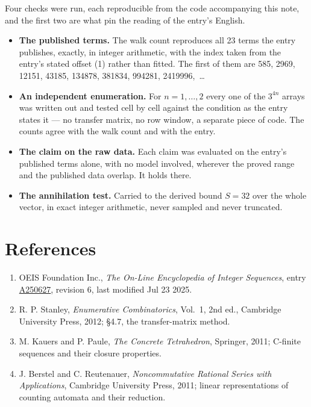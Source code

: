 \documentclass[11pt]{article}
\theoremstyle{definition}
\begin{document}
Four checks were run, each reproducible from the code accompanying this note, and the first two are what pin the reading of the entry's English.

\begin{itemize}

\item {\bfseries The published terms.} The walk count reproduces all 23 terms the entry publishes, exactly, in integer arithmetic, with the index taken from the entry's stated offset (1) rather than fitted. The first of them are 585, 2969, 12151, 43185, 134878, 381834, 994281, 2419996,~\dots

\item {\bfseries An independent enumeration.} For $n = 1,\dots,2$ every one of the $3^{4n}$ arrays was written out and tested cell by cell against the condition as the entry states it --- no transfer matrix, no row window, a separate piece of code. The counts agree with the walk count and with the entry.

\item {\bfseries The claim on the raw data.} Each claim was evaluated on the entry's published terms alone, with no model involved, wherever the proved range and the published data overlap. It holds there.

\item {\bfseries The annihilation test.} Carried to the derived bound $S = 32$ over the whole vector, in exact integer arithmetic, never sampled and never truncated.

\end{itemize}

\section{References}

\begin{enumerate}

\item OEIS Foundation Inc., \emph{The On-Line Encyclopedia of Integer Sequences}, entry \href{https://oeis.org/A250627}{A250627}, revision 6, last modified Jul 23 2025.

\item R. P. Stanley, \emph{Enumerative Combinatorics}, Vol.~1, 2nd ed., Cambridge University Press, 2012; \S4.7, the transfer-matrix method.

\item M. Kauers and P. Paule, \emph{The Concrete Tetrahedron}, Springer, 2011; C-finite sequences and their closure properties.

\item J. Berstel and C. Reutenauer, \emph{Noncommutative Rational Series with Applications}, Cambridge University Press, 2011; linear representations of counting automata and their reduction.

\end{enumerate}
\end{document}
